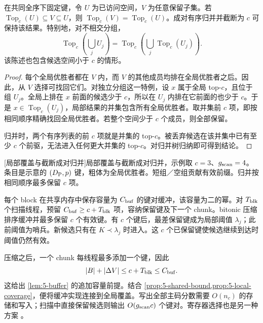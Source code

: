 \begin{resultblock}
\begin{proposition}[覆盖与截断归并]
\label{prop:5-local-coverage}
在共同全序下固定键，令 $U$ 为已访问空间，$V$ 为任意保留子集。若 $\operatorname{Top}_c(U)\subseteq V\subseteq U$，则 $\operatorname{Top}_c(V)=\operatorname{Top}_c(U)$。成对有序归并并截断为 $c$ 可保持该结果。特别地，对不相交分组，
\begin{equation}
 \operatorname{Top}_c\!\left(\bigcup_j U_j\right)
 =\operatorname{Top}_c\!\left(\bigcup_j
                    \operatorname{Top}_c(U_j)\right).
 \label{eq:5-topc-union}
\end{equation}
该陈述也包含候选空间小于 $c$ 的情形。
\end{proposition}
\begin{proof}
每个全局优胜者都在 $V$ 内，而 $V$ 的其他成员均排在全局优胜者之后。因此，从 $V$ 选择可找回它们。对独立分组这一特例，设 $x$ 属于全局 top-$c$，且位于组 $U_j$。全局上排在 $x$ 前面的候选少于 $c$，所以在 $U_j$ 内排在它前面的也少于 $c$。于是 $x\in\operatorname{Top}_c(U_j)$，局部结果的并集包含所有全局优胜者。取并集前 $c$ 项，即按相同顺序精确找回全局优胜者。若整个空间少于 $c$ 个成员，则全部保留。

归并时，两个有序列表的前 $c$ 项就是并集的 top-$c$。被丢弃候选在该并集中已有至少 $c$ 个前驱，无法进入任何更大并集的 top-$c$。对归并树归纳即可得到结论。
\end{proof}
\end{resultblock}
\par\medskip\noindent\begin{minipage}{\linewidth}
\captionsetup{hypcap=false}
\centering

[局部覆盖与截断成对归并]{局部覆盖与截断成对归并，示例取 $c=3$、$g_{\mathrm{scan}}=4$。条目是示意的 $(D_{\mathrm{P}},p)$ 键，粗体为全局优胜者。短组／空组贡献有效前缀。归并按相同顺序最多保留 $c$ 项。}
\label{fig:5-global-selection}
\end{minipage}\par\medskip
每个 block 在共享内存中保存容量为 $C_{\rm buf}$ 的键对缓冲，该容量为二的幂。对 $T_{\rm blk}$ 个扫描线程，预留 $C_{\rm buf}\geq c+T_{\rm blk}$ 项，容纳保留键及下一个 chunk。bitonic 压缩排序缓冲并最多保留 $c$ 个有效键。有 $c$ 个键后，最差保留键成为局部阈值 $\lambda_j$；此前阈值为哨兵。新候选只有在 $K\prec\lambda_j$ 时进入。这 $c$ 个已保留键使候选继续到达时阈值仍然有效。

压缩之后，一个 chunk 每线程最多添加一个键，因此
\[
 |B|+|\Delta V|\leq c+T_{\rm blk}\leq C_{\rm buf}.
\]
这给出 \cref{lem:5-buffer} 的追加容量前提。结合 \cref{prop:5-shared-bound,prop:5-local-coverage}，便将缓冲实现连接到全局覆盖。写出全部主码分数需要 $O(n_c)$ 的存储和写入；扫描中直接保留候选则输出 $O(g_{\mathrm{scan}} c)$ 个键对。寄存器选择也是另一种方案 \cite{johnson_gpu}。

